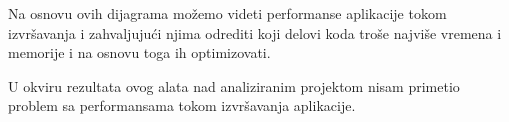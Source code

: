 \documentclass[a4paper]{article}
\begin{document}
Na osnovu ovih dijagrama možemo videti performanse aplikacije tokom izvršavanja i zahvaljujući njima odrediti koji delovi koda troše najviše vremena i memorije i na osnovu toga ih optimizovati.

U okviru rezultata ovog alata nad analiziranim projektom nisam primetio problem sa performansama tokom izvršavanja aplikacije.
\end{document}
